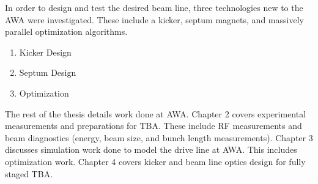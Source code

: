  \label{sec:requirements}

In order to design and test the desired beam line, three technologies 
new to the AWA were investigated. These include a kicker, septum magnets, 
and massively parallel optimization algorithms.


\begin{enumerate}
        \item Kicker Design
        \item Septum Design
        \item Optimization
\end{enumerate}






The rest of the thesis details work done at AWA.
Chapter 2 covers experimental measurements and preparations for TBA.
These include RF measurements and beam diagnostics (energy, beam size, and bunch length measurements).
Chapter 3 discusses simulation work done to model the drive line at AWA.
This includes optimization work.
Chapter 4 covers kicker and beam line optics design for fully staged TBA.

